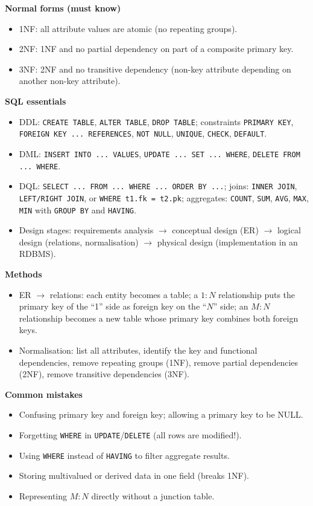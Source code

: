 \documentclass[11pt]{article}
\newcommand{\cle}[1]{{\popxbold\color{popdark}#1}}
\begin{document}
\begin{bilan}
\textbf{Normal forms (must know)}
\begin{itemize}
\item \cle{1NF}: all attribute values are atomic (no repeating groups).
\item \cle{2NF}: 1NF and no partial dependency on part of a composite primary key.
\item \cle{3NF}: 2NF and no transitive dependency (non-key attribute depending on another non-key attribute).
\end{itemize}

\textbf{SQL essentials}
\begin{itemize}
\item \cle{DDL}: \texttt{CREATE TABLE}, \texttt{ALTER TABLE}, \texttt{DROP TABLE}; constraints \texttt{PRIMARY KEY}, \texttt{FOREIGN KEY ... REFERENCES}, \texttt{NOT NULL}, \texttt{UNIQUE}, \texttt{CHECK}, \texttt{DEFAULT}.
\item \cle{DML}: \texttt{INSERT INTO ... VALUES}, \texttt{UPDATE ... SET ... WHERE}, \texttt{DELETE FROM ... WHERE}.
\item \cle{DQL}: \texttt{SELECT ... FROM ... WHERE ... ORDER BY ...}; joins: \texttt{INNER JOIN}, \texttt{LEFT/RIGHT JOIN}, or \texttt{WHERE t1.fk = t2.pk}; aggregates: \texttt{COUNT}, \texttt{SUM}, \texttt{AVG}, \texttt{MAX}, \texttt{MIN} with \texttt{GROUP BY} and \texttt{HAVING}.
\item Design stages: requirements analysis $\rightarrow$ conceptual design (ER) $\rightarrow$ logical design (relations, normalisation) $\rightarrow$ physical design (implementation in an RDBMS).
\end{itemize}

\textbf{Methods}
\begin{itemize}
\item ER $\rightarrow$ relations: each entity becomes a table; a $1{:}N$ relationship puts the primary key of the ``1'' side as foreign key on the ``$N$'' side; an $M{:}N$ relationship becomes a new table whose primary key combines both foreign keys.
\item Normalisation: list all attributes, identify the key and functional dependencies, remove repeating groups (1NF), remove partial dependencies (2NF), remove transitive dependencies (3NF).
\end{itemize}

\textbf{Common mistakes}
\begin{itemize}
\item Confusing primary key and foreign key; allowing a primary key to be NULL.
\item Forgetting \texttt{WHERE} in \texttt{UPDATE}/\texttt{DELETE} (all rows are modified!).
\item Using \texttt{WHERE} instead of \texttt{HAVING} to filter aggregate results.
\item Storing multivalued or derived data in one field (breaks 1NF).
\item Representing $M{:}N$ directly without a junction table.
\end{itemize}


\end{bilan}
\end{document}

